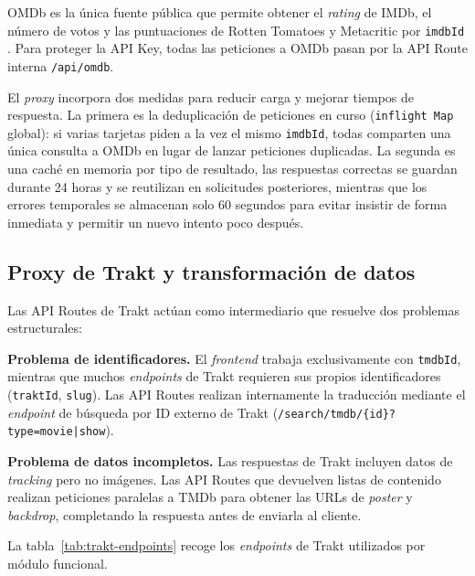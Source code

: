 OMDb es la única fuente pública que permite obtener el \textit{rating} de IMDb, el número de votos y las puntuaciones de Rotten Tomatoes y Metacritic por \texttt{imdbId} \parencite{OMDb:2024}. Para proteger la API Key, todas las peticiones a OMDb pasan por la API Route interna \texttt{/api/omdb}.

El \textit{proxy} incorpora dos medidas para reducir carga y mejorar tiempos de respuesta. La primera es la deduplicación de peticiones en curso (\texttt{inflight Map} global): si varias tarjetas piden a la vez el mismo \texttt{imdbId}, todas comparten una única consulta a OMDb en lugar de lanzar peticiones duplicadas. La segunda es una caché en memoria por tipo de resultado, las respuestas correctas se guardan durante 24 horas y se reutilizan en solicitudes posteriores, mientras que los errores temporales se almacenan solo 60 segundos para evitar insistir de forma inmediata y permitir un nuevo intento poco después.

\subsection{Proxy de Trakt y transformación de datos}

Las API Routes de Trakt actúan como intermediario que resuelve dos problemas estructurales:

\textbf{Problema de identificadores.} El \textit{frontend} trabaja exclusivamente con \texttt{tmdbId}, mientras que muchos \textit{endpoints} de Trakt requieren sus propios identificadores (\texttt{traktId}, \texttt{slug}). Las API Routes realizan internamente la traducción mediante el \textit{endpoint} de búsqueda por ID externo de Trakt (\texttt{/search/tmdb/\{id\}?type=movie|show}).

\textbf{Problema de datos incompletos.} Las respuestas de Trakt incluyen datos de \textit{tracking} pero no imágenes. Las API Routes que devuelven listas de contenido realizan peticiones paralelas a TMDb para obtener las URLs de \textit{poster} y \textit{backdrop}, completando la respuesta antes de enviarla al cliente.

La tabla~\ref{tab:trakt-endpoints} recoge los \textit{endpoints} de Trakt utilizados por módulo funcional.

